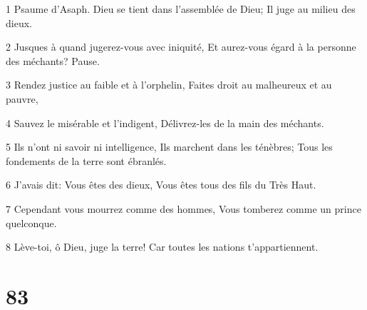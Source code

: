 \par 1 Psaume d'Asaph. Dieu se tient dans l'assemblée de Dieu; Il juge au milieu des dieux.
\par 2 Jusques à quand jugerez-vous avec iniquité, Et aurez-vous égard à la personne des méchants? Pause.
\par 3 Rendez justice au faible et à l'orphelin, Faites droit au malheureux et au pauvre,
\par 4 Sauvez le misérable et l'indigent, Délivrez-les de la main des méchants.
\par 5 Ils n'ont ni savoir ni intelligence, Ils marchent dans les ténèbres; Tous les fondements de la terre sont ébranlés.
\par 6 J'avais dit: Vous êtes des dieux, Vous êtes tous des fils du Très Haut.
\par 7 Cependant vous mourrez comme des hommes, Vous tomberez comme un prince quelconque.
\par 8 Lève-toi, ô Dieu, juge la terre! Car toutes les nations t'appartiennent.

\chapter{83}


